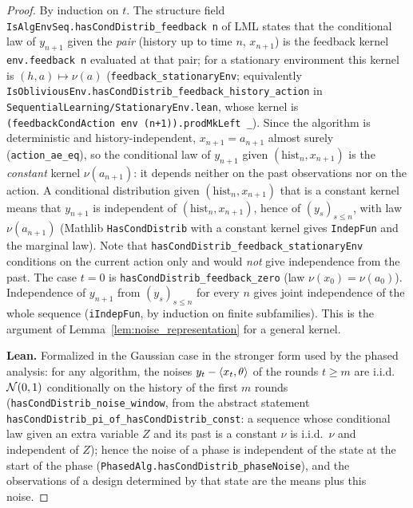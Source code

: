 \begin{proof}
\leanok
By induction on $t$. The structure field \texttt{IsAlgEnvSeq.hasCondDistrib\_feedback n} of
LML states that the conditional law of $y_{n+1}$ given the \emph{pair} (history up to time
$n$, $x_{n+1}$) is the feedback kernel \texttt{env.feedback n} evaluated at that pair; for a
stationary environment this kernel is $(h,a)\mapsto\nu(a)$ (\texttt{feedback\_stationaryEnv};
equivalently \texttt{IsObliviousEnv.hasCondDistrib\_feedback\_history\_action} in
\texttt{SequentialLearning/StationaryEnv.lean}, whose kernel is
\texttt{(feedbackCondAction env (n+1)).prodMkLeft \_}). Since the algorithm is deterministic
and history-independent, $x_{n+1} = a_{n+1}$ almost surely (\texttt{action\_ae\_eq}), so the
conditional law of $y_{n+1}$ given $(\mathrm{hist}_n, x_{n+1})$ is the \emph{constant} kernel
$\nu(a_{n+1})$: it depends neither on the past observations nor on the action. A conditional
distribution given $(\mathrm{hist}_n,x_{n+1})$ that is a constant kernel means that $y_{n+1}$
is independent of $(\mathrm{hist}_n,x_{n+1})$, hence of $(y_s)_{s\le n}$, with law
$\nu(a_{n+1})$ (Mathlib \texttt{HasCondDistrib} with a constant kernel gives \texttt{IndepFun}
and the marginal law). Note that \texttt{hasCondDistrib\_feedback\_stationaryEnv} conditions
on the current action only and would \emph{not} give independence from the past. The case
$t = 0$ is \texttt{hasCondDistrib\_feedback\_zero} (law $\nu(x_0) = \nu(a_0)$). Independence of
$y_{n+1}$ from $(y_s)_{s\le n}$ for every $n$ gives joint independence of the whole sequence
(\texttt{iIndepFun}, by induction on finite subfamilies). This is the argument of
Lemma~\ref{lem:noise_representation} for a general kernel.

\textbf{Lean.} Formalized in the Gaussian case in the stronger form used by the phased
analysis: for any algorithm, the noises $y_t - \langle x_t, \theta \rangle$ of the rounds $t \ge m$ are
i.i.d.\ $\mathcal{N}(0,1)$ conditionally on the history of the first $m$ rounds
(\texttt{hasCondDistrib\_noise\_window}, from the abstract statement
\texttt{hasCondDistrib\_pi\_of\_hasCondDistrib\_const}: a sequence whose conditional law
given an extra variable $Z$ and its past is a constant $\nu$ is i.i.d.\ $\nu$ and independent
of $Z$); hence the noise of a phase is independent of the state at the start of the phase
(\texttt{PhasedAlg.hasCondDistrib\_phaseNoise}), and the observations of a design determined
by that state are the means plus this noise.
\end{proof}

